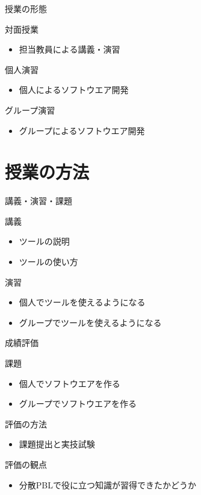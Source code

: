 \documentclass[12pt, t, aspectratio=169]{beamer}
\begin{document}
\begin{frame}[label=sec-1-2-3]{授業の形態}
\begin{block}{対面授業}
\begin{itemize}
\item 担当教員による講義・演習
\end{itemize}
\end{block}
\begin{block}{個人演習}
\begin{itemize}
\item 個人によるソフトウエア開発
\end{itemize}
\end{block}
\begin{block}{グループ演習}
\begin{itemize}
\item グループによるソフトウエア開発
\end{itemize}
\end{block}
\end{frame}
\section{授業の方法}
\label{sec-1-3}
\begin{frame}[label=sec-1-3-1]{講義・演習・課題}
\begin{block}{講義}
\begin{itemize}
\item ツールの説明
\item ツールの使い方
\end{itemize}
\end{block}
\begin{block}{演習}
\begin{itemize}
\item 個人でツールを使えるようになる
\item グループでツールを使えるようになる
\end{itemize}
\end{block}
\end{frame}
\begin{frame}[label=sec-1-3-2]{成績評価}
\begin{block}{課題}
\begin{itemize}
\item 個人でソフトウエアを作る
\item グループでソフトウエアを作る
\end{itemize}
\end{block}
\begin{block}{評価の方法}
\begin{itemize}
\item 課題提出と実技試験
\end{itemize}
\end{block}
\begin{block}{評価の観点}
\begin{itemize}
\item 分散PBLで役に立つ知識が習得できたかどうか
\end{itemize}
\end{block}
\end{frame}
\end{document}
